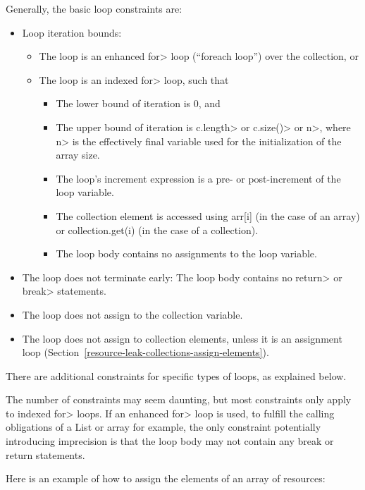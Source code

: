 Generally, the basic loop constraints are:
\begin{itemize}
\item Loop iteration bounds:
  \begin{itemize}
  \item
    The loop is an enhanced \<for> loop (``foreach loop'') over the collection, or
  \item
    The loop is an indexed \<for> loop, such that
    \begin{itemize}
    \item The lower bound of iteration is 0, and
    \item The upper bound of iteration is \<c.length> or \<c.size()> or \<n>,
      where \<n> is the effectively final variable used for the initialization of
      the array size.
    \item The loop's increment expression is a pre- or post-increment of the
            loop variable.
    \item The collection element is accessed using arr[i] (in the case of an array) or collection.get(i) (in the case of a collection).
    \item The loop body contains no assignments to the loop variable.
    \end{itemize}
  \end{itemize}
\item The loop does not terminate early: The loop body contains no \<return> or \<break> statements.
\item The loop does not assign to the collection variable.
\item The loop does not assign to collection elements, unless it is an
  assignment loop (Section~\ref{resource-leak-collections-assign-elements}).
\end{itemize}

\noindent There are additional constraints for specific types of loops, as
explained below.

The number of constraints may seem daunting, but most constraints only apply to indexed \<for> loops. If an enhanced \<for> loop is used, to fulfill the calling obligations of a List or array for example, the only constraint potentially introducing imprecision is that the loop body may not contain any break or return statements.


Here is an example of how to assign the elements of an array of resources:

